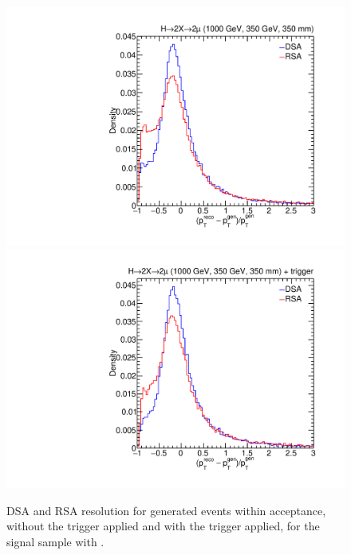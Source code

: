 \begin{figure}[p]
  \centering
  \includegraphics[width=\DSquareWidth]{figures/displaced/PTRES_2Mu2J_1000_350_350.pdf}
  \hspace*{-2em}
  \includegraphics[width=\DSquareWidth]{figures/displaced/PTRES_Trig_2Mu2J_1000_350_350.pdf}
  \caption[DSA and RSA \pT resolution for generated events within acceptance]{DSA and RSA \pT resolution for generated events within acceptance,  without the trigger applied and  with the trigger applied, for the \twoMu signal sample with .}
  \label{fig:dd:PTRES_DSA_RSA}
\end{figure}

